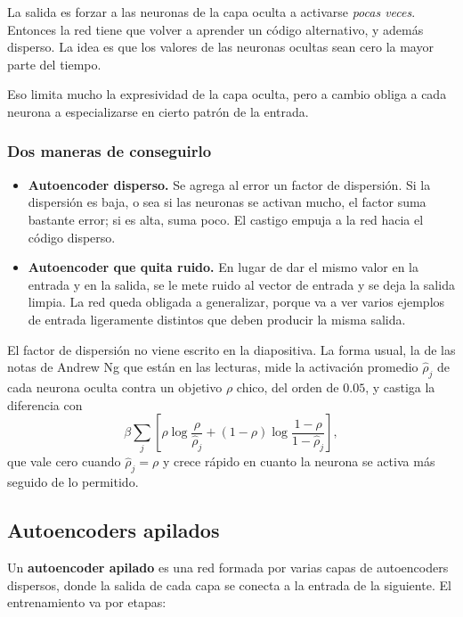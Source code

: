 \documentclass[11pt,letterpaper]{article}
\begin{document}
La salida es forzar a las neuronas de la capa oculta a activarse
\emph{pocas veces}. Entonces la red tiene que volver a aprender un
código alternativo, y además disperso. La idea es que los valores de
las neuronas ocultas sean cero la mayor parte del tiempo.

Eso limita mucho la expresividad de la capa oculta, pero a cambio
obliga a cada neurona a especializarse en cierto patrón de la entrada.

\subsubsection*{Dos maneras de conseguirlo}

\begin{itemize}[itemsep=0.4em]
  \item \textbf{Autoencoder disperso.} Se agrega al error un factor de
        dispersión. Si la dispersión es baja, o sea si las neuronas se
        activan mucho, el factor suma bastante error; si es alta, suma
        poco. El castigo empuja a la red hacia el código disperso.
  \item \textbf{Autoencoder que quita ruido.} En lugar de dar el mismo
        valor en la entrada y en la salida, se le mete ruido al vector
        de entrada y se deja la salida limpia. La red queda obligada a
        generalizar, porque va a ver varios ejemplos de entrada
        ligeramente distintos que deben producir la misma salida.
\end{itemize}

El factor de dispersión no viene escrito en la diapositiva. La forma
usual, la de las notas de Andrew Ng que están en las lecturas, mide la
activación promedio $\hat{\rho}_j$ de cada neurona oculta contra un
objetivo $\rho$ chico, del orden de $0.05$, y castiga la diferencia
con
\[
    \beta \sum_j \left[
      \rho \log \frac{\rho}{\hat{\rho}_j}
      + (1 - \rho) \log \frac{1 - \rho}{1 - \hat{\rho}_j}
    \right] ,
\]
que vale cero cuando $\hat{\rho}_j = \rho$ y crece rápido en cuanto la
neurona se activa más seguido de lo permitido.

\subsection*{Autoencoders apilados}

Un \textbf{autoencoder apilado} es una red formada por varias capas de
autoencoders dispersos, donde la salida de cada capa se conecta a la
entrada de la siguiente. El entrenamiento va por etapas:
\end{document}

